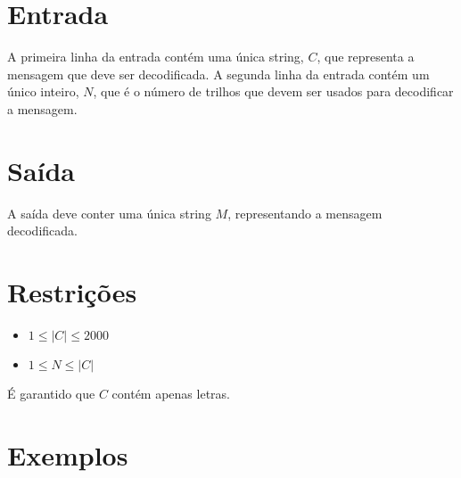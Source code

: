 \section*{Entrada}

A primeira linha da entrada contém uma única string, $C$, que representa a mensagem que deve ser decodificada. 
A segunda linha da entrada contém um único inteiro, $N$, que é o número de trilhos que devem ser usados para decodificar a mensagem.

\section*{Saída}

A saída deve conter uma única string $M$, representando a mensagem decodificada.

\section*{Restrições}

\begin{itemize}
\item $1 \leq |C| \leq 2000$
\item $1 \leq N \leq |C|$
\end{itemize}

É garantido que $C$ contém apenas letras.

\section*{Exemplos}

\exemplo
